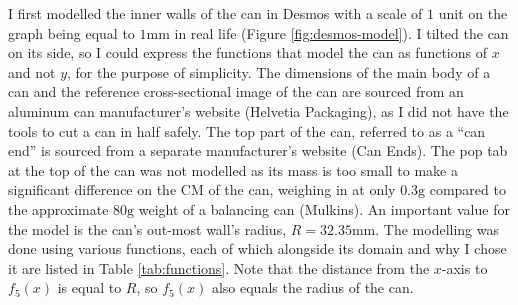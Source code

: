 \documentclass[11pt]{article}
\begin{document}
    I first modelled the inner walls of the can in Desmos with a scale of $1$ unit on the graph being equal to $1 \mathrm{mm}$ in real life (Figure \ref{fig:desmos-model}). I tilted the can on its side, so I could express the functions that model the can as functions of $x$ and not $y$, for the purpose of simplicity. The dimensions of the main body of a can and the reference cross-sectional image of the can are sourced from an aluminum can manufacturer's website (Helvetia Packaging), as I did not have the tools to cut a can in half safely. The top part of the can, referred to as a ``can end'' is sourced from a separate manufacturer's website (Can Ends). The pop tab at the top of the can was not modelled as its mass is too small to make a significant difference on the CM of the can, weighing in at only $0.3 \mathrm{g}$ compared to the approximate $80 \mathrm{g}$ weight of a balancing can (Mulkins). An important value for the model is the can's out-most wall's radius, $R = 32.35 \mathrm{mm}$. The modelling was done using various functions, each of which alongside its domain and why I chose it are listed in Table \ref{tab:functions}. Note that the distance from the $x$-axis to $f_5(x)$ is equal to $R$, so $f_5(x)$ also equals the radius of the can.
\end{document}
